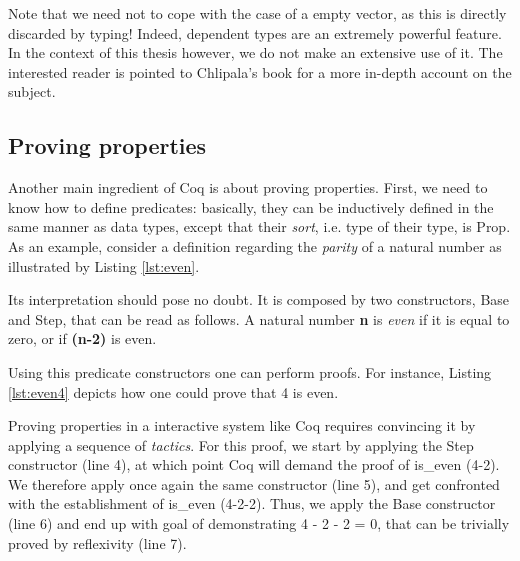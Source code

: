 	\noindent Note that we need not to cope with the case of a empty vector, as this is directly
	discarded by typing! Indeed, dependent types are an extremely powerful feature. In the context
	of this thesis however, we do not make an extensive use of it. The interested reader is pointed
	to Chlipala's book \cite{chlipalacpdt2011} for a more in-depth account on the subject.

	 

\subsection{Proving properties}
\label{sub:provecoq}	
	
			
	Another main ingredient of Coq is about proving properties. First, we need
	to know how to define predicates: basically, they can be inductively 
	defined in the same manner as  data types, except that their \textit{sort},
	i.e. type of their type, is \textsf{Prop}. 
	As an example, consider a definition regarding the 
	\textit{parity} of a natural number as illustrated by Listing \ref{lst:even}.
	
			
	
	
	\noindent Its interpretation should pose no doubt. It is composed by two
	constructors, \textsf{Base} and \textsf{Step}, that can be read as follows.
	A natural number \textbf{n} is \textit{even} if it is equal to zero, 
	or if \textbf{(n-2)} is even. 
	
	Using this predicate constructors one can perform proofs. For instance,
	Listing \ref{lst:even4} depicts how one could prove that 4 is even.
	
	
			
	
	\noindent Proving properties in a interactive system like Coq
	requires convincing it by applying a sequence of \textit{tactics}. For this 
	proof,	we start by applying the \textsf{Step} constructor (line 4), at which point
	Coq will demand the proof of \textsf{is\_even (4-2)}. We therefore apply once again
	the same constructor (line 5), and get confronted with the establishment of
	\textsf{is\_even (4-2-2)}. Thus, we apply the \textsf{Base} constructor (line 6)
	and end up with goal of demonstrating \textsf{4 - 2 - 2 = 0}, that can be
	trivially proved by reflexivity (line 7).
	
